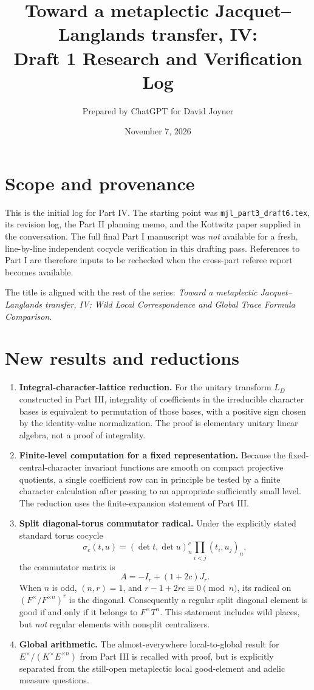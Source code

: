 \documentclass[11pt]{article}
\title{Toward a metaplectic Jacquet--Langlands transfer, IV:\\Draft 1 Research and Verification Log}
\author{Prepared by ChatGPT for David Joyner}
\date{November 7, 2026}
\begin{document}
\maketitle
\section*{Scope and provenance}
This is the initial log for Part IV. The starting point was
\texttt{mjl\_part3\_draft6.tex}, its revision log, the Part II planning
memo, and the Kottwitz paper supplied in the conversation. The
full final Part I manuscript was \emph{not} available for a fresh,
line-by-line independent cocycle verification in this drafting pass.
References to Part I are therefore inputs to be rechecked when the
cross-part referee report becomes available.

The title is aligned with the rest of the series:
\emph{Toward a metaplectic Jacquet--Langlands transfer, IV: Wild
Local Correspondence and Global Trace Formula Comparison}.

\section*{New results and reductions}
\begin{enumerate}[label=\arabic*.]
\item \textbf{Integral-character-lattice reduction.}
For the unitary transform $L_D$ constructed in Part III,
integrality of coefficients in the irreducible character bases
is equivalent to permutation of those bases, with a positive sign
chosen by the identity-value normalization. The proof is elementary
unitary linear algebra, not a proof of integrality.

\item \textbf{Finite-level computation for a fixed representation.}
Because the fixed-central-character invariant functions are smooth
on compact projective quotients, a single coefficient row can in
principle be tested by a finite character calculation after
passing to an appropriate sufficiently small level. The reduction
uses the finite-expansion statement of Part III.

\item \textbf{Split diagonal-torus commutator radical.}
Under the explicitly stated standard torus cocycle
\[
\sigma_c(t,u)=(\det t,\det u)_n^c\prod_{i<j}(t_i,u_j)_n,
\]
the commutator matrix is
\[
 A=-I_r+(1+2c)J_r.
\]
When $n$ is odd, $(n,r)=1$, and $r-1+2rc\equiv0\pmod n$,
its radical on $(F^\times/F^{\times n})^r$ is the diagonal.
Consequently a regular split diagonal element is good if and only if
it belongs to $F^\times T^n$. This statement includes wild places,
but \emph{not} regular elements with nonsplit centralizers.

\item \textbf{Global arithmetic.}
The almost-everywhere local-to-global result for
$E^\times/(K^\times E^{\times n})$ from Part III is recalled with
proof, but is explicitly separated from the still-open metaplectic
local good-element and adelic measure questions.
\end{enumerate}
\end{document}
